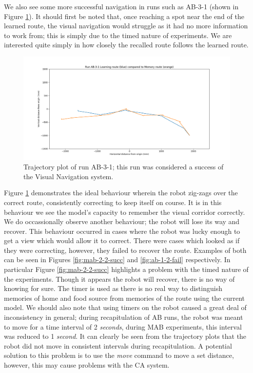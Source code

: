 \documentclass[a4paper,11pt,twoside,openright]{article}
\begin{document}
We also see some more successful navigation in runs such as AB-3-1 (shown in Figure \ref{fig:ab-3-1-succ}). It should first be
noted that, once reaching a spot near the end of the learned route, the visual navigation would struggle as it had no
more information to work from; this is simply due to the timed nature of experiments. We are interested quite simply in how
closely the recalled route follows the learned route. 

\begin{figure}
 \centering
  \includegraphics[width=\textwidth]{AB-3-1}
  \caption{
    \label{fig:ab-3-1-succ} Trajectory plot of run AB-3-1; this run was considered a success of the Visual Navigation
    system.
  }
\end{figure}

Figure \ref{fig:ab-3-1-succ} demonstrates the ideal behaviour wherein the robot zig-zags over the correct route, consistently
correcting to keep itself on course. It is in this behaviour we see the model's capacity to remember the visual corridor
correctly. We do occassionally observe another behaviour; the robot will lose its way and recover. This behaviour occurred in
cases where the robot was lucky enough to get a view which would allow it to correct. There were cases which looked as if
they were correcting, however, they failed to recover the route. Examples of both can be seen in Figures \ref{fig:mab-2-2-succ}
and \ref{fig:ab-1-2-fail} respectively. In particular Figure \ref{fig:mab-2-2-succ} highlights a problem with the timed
nature of the experiments. Though it appears the robot will recover, there is no way of knowing for sure.
The timer is used as there is no real way to distinguish memories of home and food source from memories of the route using
the current model. We should also note that using timers on the robot caused a great deal of inconsistency in general; during
recapitulation of AB runs, the robot was meant to move for a time interval of 2 \textit{seconds}, during MAB experiments, this
interval was reduced to 1 \textit{second}. It can clearly be seen from the trajectory plots that the robot did not move in
consistent intervals during recapitulation. A potential solution to this problem is to use the \textit{move} command to
move a set distance, however, this may cause problems with the CA system.
\end{document}
